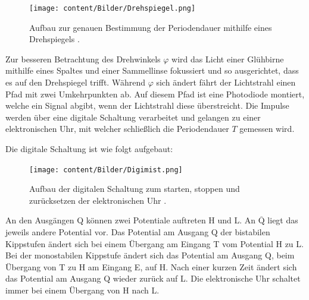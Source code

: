                  \begin{figure}[H]
                          \centering
                          \texttt{[image: content/Bilder/Drehspiegel.png]}
                          \caption{Aufbau zur genauen Bestimmung der Periodendauer mithilfe eines Drehspiegels \cite{V102}.}
                          \label{fig:Drehspiegel}
                        \end{figure}
Zur besseren Betrachtung des Drehwinkels $\varphi$ wird das Licht einer Glühbirne
 mithilfe eines Spaltes und einer Sammellinse fokussiert und so ausgerichtet,
  dass es auf den Drehspiegel trifft. Während $\varphi$ sich ändert fährt der
   Lichtstrahl einen Pfad mit zwei Umkehrpunkten ab. Auf diesem Pfad ist eine
    Photodiode montiert, welche ein Signal abgibt, wenn der Lichtstrahl
     diese überstreicht. Die Impulse werden über eine digitale Schaltung verarbeitet und
      gelangen zu einer elektronischen Uhr, mit welcher schließlich die Periodendauer $T$ gemessen wird.

      Die digitale Schaltung ist wie folgt aufgebaut:
      \begin{figure}[H]
               \centering
               \texttt{[image: content/Bilder/Digimist.png]}
               \caption{Aufbau der digitalen Schaltung zum starten, stoppen und zurücksetzen der elektronischen Uhr \cite{V102}\cite{V104}.}
               \label{fig:digimist}
             \end{figure}
             An den Ausgängen Q können zwei Potentiale auftreten H und L. An $\overline{\text{Q}}$ liegt das jeweils andere Potential vor. Das Potential am Ausgang Q der bistabilen Kippstufen ändert sich bei einem Übergang am Eingang T vom Potential H zu L. Bei der monostabilen Kippstufe ändert sich das Potential am Ausgang Q, beim Übergang von T zu H am Eingang E, auf H. Nach einer kurzen Zeit ändert sich das Potential am Ausgang Q wieder zurück auf L. Die elektronische Uhr schaltet immer bei einem Übergang von H nach L.
              
